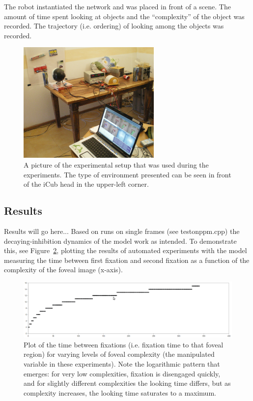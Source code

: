 \documentclass[12pt]{article}
\begin{document}
The robot instantiated the network and was placed in front of a scene.
The amount of time spent looking at objects and the ``complexity'' of
the object was recorded. The trajectory (i.e. ordering) of looking
among the objects was recorded.

\begin{figure} [!t]
\centering
\includegraphics[width=7.0cm]{icub_setup.jpg}
\caption{A picture of the experimental setup that was used during the
  experiments. The type of environment presented can be seen in front
  of the iCub head in the upper-left corner.}
\label{fig:icub_setup}
\end{figure}

\subsection{Results}
Results will go here... Based on runs on single frames (see
testonppm.cpp) the decaying-inhibition dynamics of the model work as
intended. To demonstrate this, see
Figure~\ref{fig:complex_vs_fixtime}, plotting the results of automated
experiments with the model measuring the time between first fixation
and second fixation as a function of the complexity of the foveal
image (x-axis).
\begin{figure} [!t]
\centering
\includegraphics[width=15.0cm]{complex_vs_fixtime.png}
\caption{Plot of the time between fixations (i.e. fixation time to
  that foveal region) for varying levels of foveal complexity (the
  manipulated variable in these experiments). Note the logarithmic
  pattern that emerges: for very low complexities, fixation is
  disengaged quickly, and for slightly different complexities the
  looking time differs, but as complexity increases, the looking time
  saturates to a maximum.}
\label{fig:complex_vs_fixtime}
\end{figure}
\end{document}
